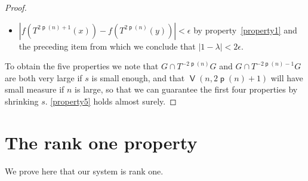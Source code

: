 \documentclass[AHL,Unicode,longabstracts,published]{cedram}
\DeclareMathOperator{\bad}{\mathsf{V}}
\DeclareMathOperator{\p}{\mathsf{p}}
\begin{document}
\begin{proof}
\begin{itemize}
\item $|f(T^{2\p(n) +1}(x)) - f(T^{2\p(n)}(y))| < \epsilon$ by property~\eqref{property1} and the preceding item
from which we conclude that $|1 - \lambda| < 2\epsilon$.
\end{itemize}
To obtain the five properties we note that $G \cap T^{-2\p(n)} G$ and $G \cap T^{-2\p(n)-1} G$ are both very large if $s$ is small enough, and that $\bad(n,2\p(n)+1)$ will have small measure if $n$ is large, so that we can guarantee the first four properties by shrinking $s$. \eqref{property5} holds almost surely.
\end{proof}


\pagebreak{}

\section{The rank one property}\label{sec:rank one}

We prove here that our system is rank one.
\end{document}
